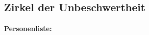 \subsection{Zirkel der Unbeschwertheit}
    \label{locs:zirkel-der-unbeschwertheit}

    \paragraph{Personenliste:} 
